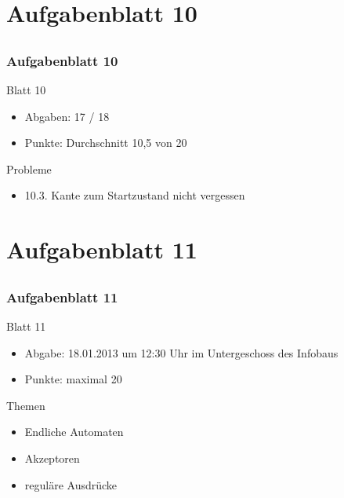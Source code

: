 
\section[Rückblick ÜB 10]{Aufgabenblatt 10}
\subsection*{}
\begin{frame}
	\frametitle{Aufgabenblatt 10}
	\begin{block}{Blatt 10}
		\begin{itemize}
			\item Abgaben: 17 / 18
			\item Punkte: Durchschnitt 10,5 von 20
		\end{itemize}
   \end{block}
	\begin{block}{Probleme}
 		\begin{itemize}
			\item 10.3. Kante zum Startzustand nicht vergessen
 	  \end{itemize}
	\end{block}
\end{frame}

\section[Blatt 11]{Aufgabenblatt 11}
\subsection*{}
\begin{frame}
	\frametitle{Aufgabenblatt 11}
	\begin{block}{Blatt 11}
		\begin{itemize}
			\item Abgabe: 18.01.2013 um 12:30 Uhr im Untergeschoss des Infobaus
			\item Punkte: maximal 20
		\end{itemize}
  	\end{block}
	\begin{block}{Themen}
		\begin{itemize}
	  		\item Endliche Automaten
	  		\item Akzeptoren
			\item reguläre Ausdrücke
	 	\end{itemize}
	\end{block}
\end{frame}
